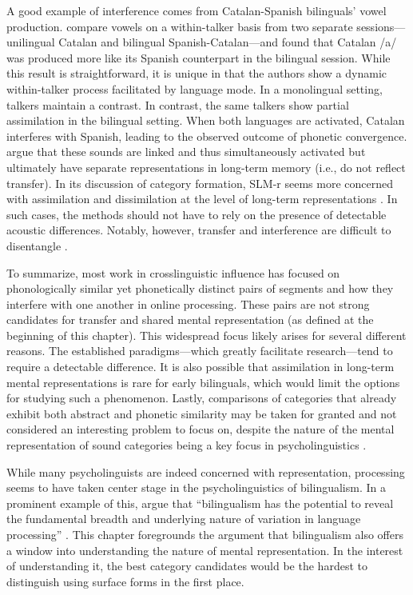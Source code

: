 A good example of interference comes from Catalan-Spanish bilinguals' vowel production. \citet{simonet_2019_convergence} compare vowels on a within-talker basis from two separate sessions---unilingual Catalan and bilingual Spanish-Catalan---and found that Catalan /a/ was produced more like its Spanish counterpart in the bilingual session. While this result is straightforward, it is unique in that the authors show a dynamic within-talker process facilitated by language mode. In a monolingual setting, talkers maintain a contrast. In contrast, the same talkers show partial assimilation in the bilingual setting. When both languages are activated, Catalan interferes with Spanish, leading to the observed outcome of phonetic convergence. \citet{simonet_2019_convergence} argue that these sounds are linked and thus simultaneously activated but ultimately have separate representations in long-term memory (i.e., do not reflect transfer). In its discussion of category formation, SLM-r seems more concerned with assimilation and dissimilation at the level of long-term representations \citep[i.e., transfer][]{flege_2021_slmr}. In such cases, the methods should not have to rely on the presence of detectable acoustic differences. Notably, however, transfer and interference are difficult to disentangle \citep{grosjean_2011_transfer}. 

To summarize, most work in crosslinguistic influence has focused on phonologically similar yet phonetically distinct pairs of segments and how they interfere with one another in online processing. These pairs are not strong candidates for transfer and shared mental representation (as defined at the beginning of this chapter). This widespread focus likely arises for several different reasons. The established paradigms---which greatly facilitate research---tend to require a detectable difference. It is also possible that assimilation in long-term mental representations is rare for early bilinguals, which would limit the options for studying such a phenomenon. Lastly, comparisons of categories that already exhibit both abstract and phonetic similarity may be taken for granted and not considered an interesting problem to focus on, despite the nature of the mental representation of sound categories being a key focus in psycholinguistics \citep{samuel_2020_resist}. 

While many psycholinguists are indeed concerned with representation, processing seems to have taken center stage in the psycholinguistics of bilingualism. In a prominent example of this, \citet{fricke_2019_bilingualism} argue that ``bilingualism has the potential to reveal the fundamental breadth and underlying nature of variation in language processing'' \citeyearpar[][p. 204]{fricke_2019_bilingualism}. This chapter foregrounds the argument that bilingualism also offers a window into understanding the nature of mental representation. In the interest of understanding it, the best category candidates would be the hardest to distinguish using surface forms in the first place. 


